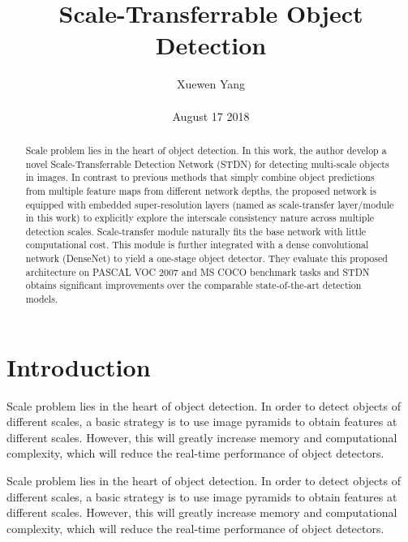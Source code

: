 \documentclass[10pt,twocolumn,letterpaper]{article}
\author{Xuewen Yang\\\\
August 17 2018}
\title{Scale-Transferrable Object Detection}
\begin{document}
\maketitle
\begin{abstract}
Scale problem lies in the heart of object detection. In this
work, the author develop a novel Scale-Transferrable Detection
Network (STDN) for detecting multi-scale objects in images.
In contrast to previous methods that simply combine
object predictions from multiple feature maps from different
network depths, the proposed network is equipped with
embedded super-resolution layers (named as scale-transfer
layer/module in this work) to explicitly explore the interscale
consistency nature across multiple detection scales.
Scale-transfer module naturally fits the base network with
little computational cost. This module is further integrated
with a dense convolutional network (DenseNet) to yield a
one-stage object detector. They evaluate this proposed architecture
on PASCAL VOC 2007 and MS COCO benchmark
tasks and STDN obtains significant improvements over the
comparable state-of-the-art detection models.
\end{abstract}
\section{Introduction}
Scale problem lies in the heart of object detection. In
order to detect objects of different scales, a basic strategy
is to use image pyramids to obtain features at different
scales. However, this will greatly increase memory and
computational complexity, which will reduce the real-time
performance of object detectors.

Scale problem lies in the heart of object detection. In
order to detect objects of different scales, a basic strategy
is to use image pyramids to obtain features at different
scales. However, this will greatly increase memory and
computational complexity, which will reduce the real-time
performance of object detectors.
\end{document}
